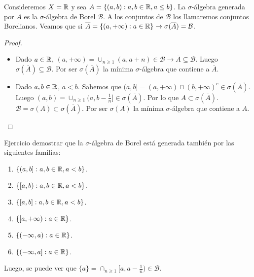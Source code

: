 \begin{eg}
    Consideremos $X = \mathbb{R}$ y sea $A = \{ (a, b) : a, b \in \mathbb{R}, a \leq b \}$. La $\sigma$-álgebra generada por $A$ es la $\sigma$-álgebra de Borel $\mathcal{B}$.
    A los conjuntos de $\mathcal{B}$ los llamaremos conjuntos Borelianos. Veamos que si $\overline{A} = \{ (a, +\infty) : a \in \mathbb{R} \} \to \sigma(\overline{A}) = \mathcal{B}$.
    \begin{proof}
        \begin{itemize}
            \item Dado $a \in \mathbb{R}$, $(a, +\infty) = \cup_{n \geq 1} (a, a+n) \in \mathcal{B} \to \overline{A} \subseteq \mathcal{B}$.
                  Luego $\sigma(\overline{A}) \subseteq \mathcal{B}$. Por ser $\sigma(\overline{A})$ la mínima $\sigma$-álgebra que contiene a $\overline{A}$.
            \item Dado $a, b \in \mathbb{R}$, $a < b$. Sabemos que $(a, b] = (a, +\infty) \cap (b, +\infty)^c \in \sigma(\overline{A})$.
                  Luego $(a, b) = \cup_{n \geq 1} (a, b - \frac{1}{n}] \in \sigma(\overline{A})$. Por lo que $A \subset \sigma(\overline{A})$.
                  $\mathcal{B} = \sigma(A) \subset \sigma(\overline{A})$. Por ser $\sigma(A)$ la mínima $\sigma$-álgebra que contiene a $A$.
        \end{itemize}
    \end{proof}
\end{eg}

Ejercicio demostrar que la $\sigma$-álgebra de Borel está generada también por las siguientes familias:
\begin{enumerate}
    \item $\{ (a, b] : a, b \in \mathbb{R}, a < b \}$.
    \item $\{ [a, b) : a, b \in \mathbb{R}, a < b \}$.
    \item $\{ [a, b] : a, b \in \mathbb{R}, a < b \}$.
    \item $\{ [a, +\infty) : a \in \mathbb{R} \}$.
    \item $\{ (-\infty, a) : a \in \mathbb{R} \}$.
    \item $\{ (-\infty, a] : a \in \mathbb{R} \}$.
\end{enumerate}

Luego, se puede ver que $\{ a \} = \cap_{n \geq 1} [a, a - \frac{1}{n}) \in \mathcal{B}$.